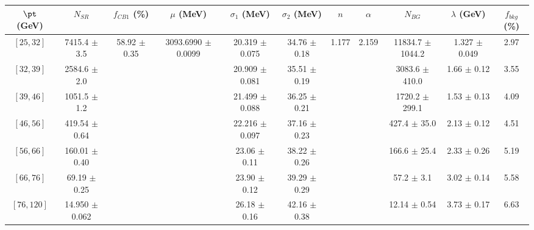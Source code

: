 \begin{tabular}{c||c|c|c|c|c|c|c|c|c||c}
$\pt$ (GeV) & $N_{SR}$ & $f_{CB1}$ (\%) & $\mu$ (MeV) & $\sigma_1$ (MeV) & $\sigma_2$ (MeV) & $n$ & $\alpha$ & $N_{BG}$ & $\lambda$ (GeV) & $f_{bkg}$ (\%) \\
\hline
$[25, 32]$ & 7415.4 $\pm$ 3.5 & \multirow{7}{*}{58.92 $\pm$ 0.35} & \multirow{7}{*}{3093.6990 $\pm$ 0.0099} & 20.319 $\pm$ 0.075 & 34.76 $\pm$ 0.18 & \multirow{7}{*}{1.177} & \multirow{7}{*}{2.159} & 11834.7 $\pm$ 1044.2 & 1.327 $\pm$ 0.049 & 2.97\\
$[32, 39]$ & 2584.6 $\pm$ 2.0 &  &  & 20.909 $\pm$ 0.081 & 35.51 $\pm$ 0.19 &  &  & 3083.6 $\pm$ 410.0 & 1.66 $\pm$ 0.12 & 3.55\\
$[39, 46]$ & 1051.5 $\pm$ 1.2 &  &  & 21.499 $\pm$ 0.088 & 36.25 $\pm$ 0.21 &  &  & 1720.2 $\pm$ 299.1 & 1.53 $\pm$ 0.13 & 4.09\\
$[46, 56]$ & 419.54 $\pm$ 0.64 &  &  & 22.216 $\pm$ 0.097 & 37.16 $\pm$ 0.23 &  &  & 427.4 $\pm$ 35.0 & 2.13 $\pm$ 0.12 & 4.51\\
$[56, 66]$ & 160.01 $\pm$ 0.40 &  &  & 23.06 $\pm$ 0.11 & 38.22 $\pm$ 0.26 &  &  & 166.6 $\pm$ 25.4 & 2.33 $\pm$ 0.26 & 5.19\\
$[66, 76]$ & 69.19 $\pm$ 0.25 &  &  & 23.90 $\pm$ 0.12 & 39.29 $\pm$ 0.29 &  &  & 57.2 $\pm$ 3.1 & 3.02 $\pm$ 0.14 & 5.58\\
$[76, 120]$ & 14.950 $\pm$ 0.062 &  &  & 26.18 $\pm$ 0.16 & 42.16 $\pm$ 0.38 &  &  & 12.14 $\pm$ 0.54 & 3.73 $\pm$ 0.17 & 6.63\\
\end{tabular}
